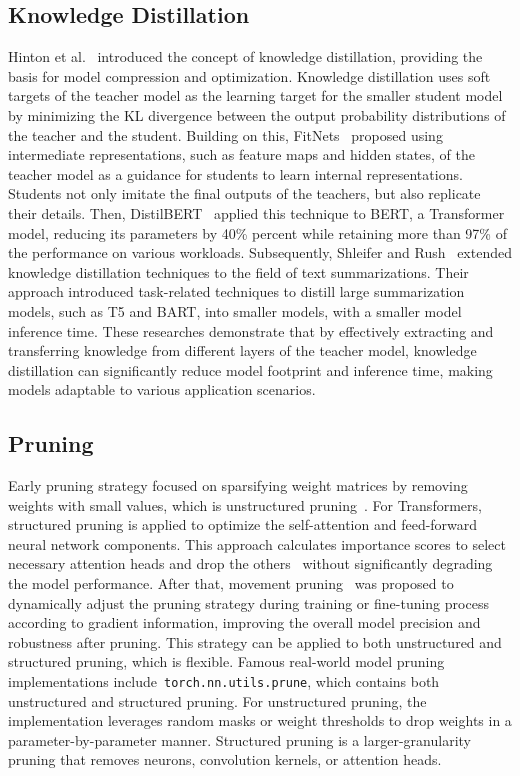 \subsection{Knowledge Distillation}\label{subsec:rw:knowledge-distillation}
Hinton et al.~\cite{hinton2015distilling} introduced the concept of knowledge distillation,
providing the basis for model compression and optimization.
Knowledge distillation uses soft targets of the teacher model as the learning target for the smaller student model
by minimizing the KL divergence between the output probability distributions of the teacher and the student.
Building on this, FitNets~\cite{romero2014fitnets} proposed using intermediate representations,
such as feature maps and hidden states, of the teacher model as a guidance for students to learn internal representations.
Students not only imitate the final outputs of the teachers, but also replicate their details.
Then, DistilBERT~\cite{sanh2019distilbert} applied this technique to BERT, a Transformer model,
reducing its parameters by 40\% percent while retaining more than 97\% of the performance on various workloads.
Subsequently, Shleifer and Rush~\cite{shleifer2020pre} extended knowledge distillation techniques to the field of text summarizations.
Their approach introduced task-related techniques to distill large summarization models,
such as T5 and BART, into smaller models, with a smaller model inference time.
These researches demonstrate that by effectively extracting and transferring knowledge from different layers of the teacher model,
knowledge distillation can significantly reduce model footprint and inference time,
making models adaptable to various application scenarios.

\subsection{Pruning}\label{subsec:rw:pruning}
Early pruning strategy focused on sparsifying weight matrices by removing weights with small values,
which is unstructured pruning~\cite{han2015learning}.
For Transformers, structured pruning is applied to optimize the self-attention and feed-forward neural network components.
This approach calculates importance scores to select necessary attention heads and drop the others~\cite{michel2019sixteen}
without significantly degrading the model performance.
After that, movement pruning~\cite{sanh2020movement} was proposed to dynamically adjust the pruning strategy during training
or fine-tuning process according to gradient information, improving the overall model precision and robustness after pruning.
This strategy can be applied to both unstructured and structured pruning, which is flexible.
Famous real-world model pruning implementations include~\texttt{torch.nn.utils.prune},
which contains both unstructured and structured pruning.
For unstructured pruning, the implementation leverages random masks or weight thresholds to drop weights in a parameter-by-parameter manner.
Structured pruning is a larger-granularity pruning that removes neurons, convolution kernels, or attention heads.

